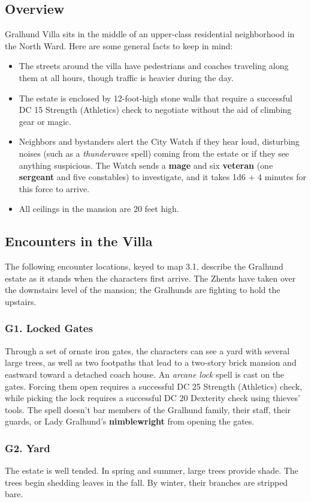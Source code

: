 \documentclass[10pt,a4paper,twoside,twocolumn,openany,nodeprecatedcode]{dndbook}
\begin{document}
\subsection{Overview}
Gralhund Villa sits in the middle of an upper-class residential neighborhood in the North Ward. Here are some general facts to keep in mind:
\begin{itemize}

\item The streets around the villa have pedestrians and coaches traveling along them at all hours, though traffic is heavier during the day.
\item The estate is enclosed by 12-foot-high stone walls that require a successful DC 15 Strength (Athletics) check to negotiate without the aid of climbing gear or magic.
\item Neighbors and bystanders alert the City Watch if they hear loud, disturbing noises (such as a \textit{thunderwave} spell) coming from the estate or if they see anything suspicious. The Watch sends a \textbf{mage} and six \textbf{veteran} (one \textbf{sergeant} and five constables) to investigate, and it takes 1d6 + 4 minutes for this force to arrive.
\item All ceilings in the mansion are 20 feet high.
\end{itemize}


\subsection{Encounters in the Villa}
The following encounter locations, keyed to map 3.1, describe the Gralhund estate as it stands when the characters first arrive. The Zhents have taken over the downstairs level of the mansion; the Gralhunds are fighting to hold the upstairs.
\subsubsection{G1. Locked Gates}
Through a set of ornate iron gates, the characters can see a yard with several large trees, as well as two footpaths that lead to a two-story brick mansion and eastward toward a detached coach house.
An \textit{arcane lock} spell is cast on the gates. Forcing them open requires a successful DC 25 Strength (Athletics) check, while picking the lock requires a successful DC 20 Dexterity check using thieves' tools. The spell doesn't bar members of the Gralhund family, their staff, their guards, or Lady Gralhund's \textbf{nimblewright} from opening the gates.
\subsubsection{G2. Yard}
The estate is well tended. In spring and summer, large trees provide shade. The trees begin shedding leaves in the fall. By winter, their branches are stripped bare.
\end{document}
